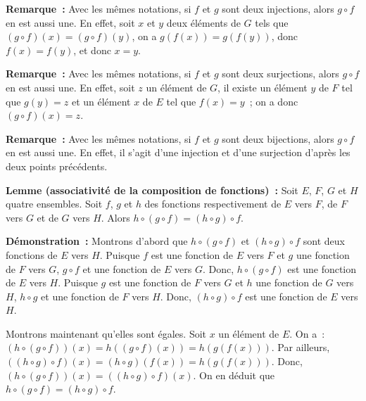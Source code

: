 \done

\medskip

\noindent\textbf{Remarque :} Avec les mêmes notations, si $f$ et $g$ sont deux injections, alors $g \circ f$ en est aussi une. 
    En effet, soit $x$ et $y$ deux éléments de $G$ tels que $(g \circ f)(x) = (g \circ f)(y)$, on a $g(f(x)) = g(f(y))$, donc $f(x) = f(y)$, et donc $x = y$.

\medskip

\noindent\textbf{Remarque :} Avec les mêmes notations, si $f$ et $g$ sont deux surjections, alors $g \circ f$ en est aussi une. 
    En effet, soit $z$ un élément de $G$, il existe un élément $y$ de $F$ tel que $g(y) = z$ et un élément $x$ de $E$ tel que $f(x) = y$ ; on a donc $(g \circ f)(x) = z$.

\medskip

\noindent\textbf{Remarque :} Avec les mêmes notations, si $f$ et $g$ sont deux bijections, alors $g \circ f$ en est aussi une. 
    En effet, il s'agit d'une injection et d'une surjection d'après les deux points précédents.

\medskip

\noindent\textbf{Lemme (associativité de la composition de fonctions) :} Soit $E$, $F$, $G$ et $H$ quatre ensembles. 
    Soit $f$, $g$ et $h$ des fonctions respectivement de $E$ vers $F$, de $F$ vers $G$ et de $G$ vers $H$. 
    Alors $h \circ (g \circ f) = (h \circ g) \circ f$.

\medskip

\noindent\textbf{Démonstration :} Montrons d'abord que $h \circ (g \circ f)$ et $(h \circ g) \circ f$ sont deux fonctions de $E$ vers $H$. 
    Puisque $f$ est une fonction de $E$ vers $F$ et $g$ une fonction de $F$ vers $G$, $g \circ f$ et une fonction de $E$ vers $G$. 
    Donc, $h \circ (g \circ f)$ est une fonction de $E$ vers $H$.
    Puisque $g$ est une fonction de $F$ vers $G$ et $h$ une fonction de $G$ vers $H$, $h \circ g$ et une fonction de $F$ vers $H$. 
    Donc, $(h \circ g) \circ f$ est une fonction de $E$ vers $H$. 

    Montrons maintenant qu'elles sont égales. 
    Soit $x$ un élément de $E$. 
    On a : $(h \circ (g \circ f))(x) = h((g \circ f)(x)) = h(g(f(x)))$.
    Par ailleurs, $((h \circ g) \circ f)(x) = (h \circ g)(f(x)) = h(g(f(x)))$. 
    Donc, $(h \circ (g \circ f))(x) = ((h \circ g) \circ f)(x)$.
    On en déduit que $h \circ (g \circ f) = (h \circ g) \circ f$.

   \done 

\medskip

